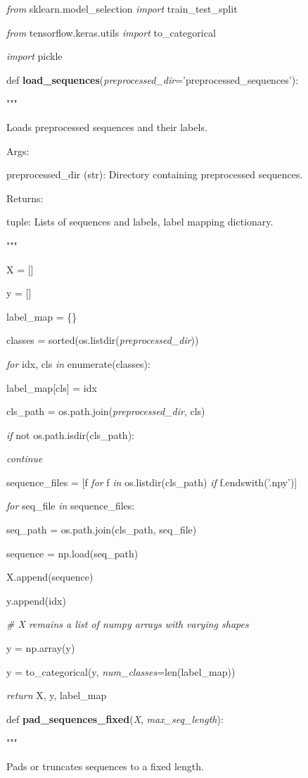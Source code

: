 \documentclass[
]{article}
\begin{document}
\emph{from} sklearn.model\_selection \emph{import} train\_test\_split

\emph{from} tensorflow.keras.utils \emph{import} to\_categorical

\emph{import} pickle

def \textbf{load\_sequences}(\emph{preprocessed\_dir}='preprocessed\_sequences'):

"""

Loads preprocessed sequences and their labels.

Args:

preprocessed\_dir (str): Directory containing preprocessed sequences.

Returns:

tuple: Lists of sequences and labels, label mapping dictionary.

"""

X = {[}{]}

y = {[}{]}

label\_map = \{\}

classes = sorted(os.listdir(\emph{preprocessed\_dir}))

\emph{for} idx, cls \emph{in} enumerate(classes):

label\_map{[}cls{]} = idx

cls\_path = os.path.join(\emph{preprocessed\_dir}, cls)

\emph{if} not os.path.isdir(cls\_path):

\emph{continue}

sequence\_files = {[}f \emph{for} f \emph{in} os.listdir(cls\_path) \emph{if} f.endswith('.npy'){]}

\emph{for} seq\_file \emph{in} sequence\_files:

seq\_path = os.path.join(cls\_path, seq\_file)

sequence = np.load(seq\_path)

X.append(sequence)

y.append(idx)

\emph{\# X remains a list of numpy arrays with varying shapes}

y = np.array(y)

y = to\_categorical(y, \emph{num\_classes}=len(label\_map))

\emph{return} X, y, label\_map

def \textbf{pad\_sequences\_fixed}(\emph{X}, \emph{max\_seq\_length}):

"""

Pads or truncates sequences to a fixed length.
\end{document}
